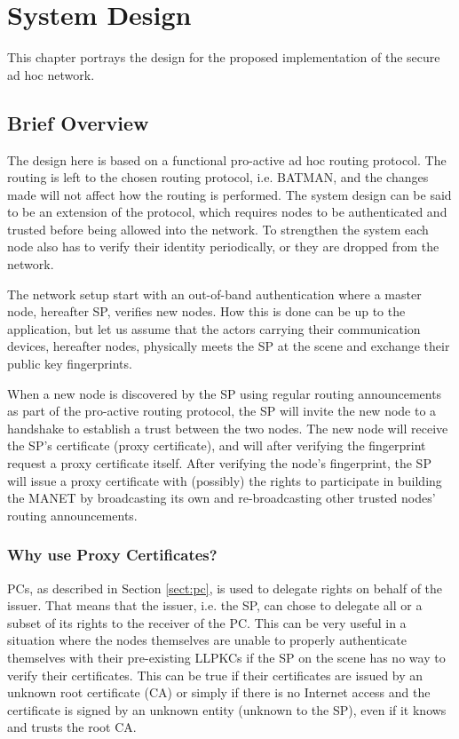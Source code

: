 \chapter{System Design}
\label{ch:design}
\acresetall

This chapter portrays the design for the proposed implementation of the secure
ad hoc network.

\section{Brief Overview}
The design here is based on a functional pro-active ad hoc routing protocol. The
routing is left to the chosen routing protocol, i.e. \ac{BATMAN}, and the
changes made will not affect how the routing is performed. The system design can
be said to be an extension of the protocol, which requires nodes to be
authenticated and trusted before being allowed into the network. To strengthen
the system each node also has to verify their identity periodically, or they are
dropped from the network.

The network setup start with an out-of-band authentication where a master node,
hereafter \ac{SP}, verifies new nodes. How this is done can be up to the
application, but let us assume that the actors carrying their communication
devices, hereafter nodes, physically meets the \ac{SP} at the scene and
exchange their public key fingerprints.

When a new node is discovered by the \ac{SP} using regular routing announcements
as part of the pro-active routing protocol, the \ac{SP} will invite the new node
to a handshake to establish a trust between the two nodes. The new node will
receive the \ac{SP}'s certificate (proxy certificate), and will after verifying
the fingerprint request a proxy certificate itself. After verifying the node's
fingerprint, the \ac{SP} will issue a proxy certificate with (possibly) the
rights to participate in building the \ac{MANET} by broadcasting its own and
re-broadcasting other trusted nodes' routing announcements.

\subsection{Why use Proxy Certificates?}
\acp{PC}, as described in Section \ref{sect:pc}, is used to delegate
rights on behalf of the issuer. That means that the issuer, i.e. the \ac{SP},
can chose to delegate all or a subset of its rights to the receiver of the
\ac{PC}. This can be very useful in a situation where the nodes themselves are
unable to properly authenticate themselves with their pre-existing \acp{LLPKC}
if the \ac{SP} on the scene has no way to verify their certificates. This can be
true if their certificates are issued by an unknown root certificate (\ac{CA})
or simply if there is no Internet access and the certificate is signed by an
unknown entity (unknown to the \ac{SP}), even if it knows and trusts the root
\ac{CA}.

